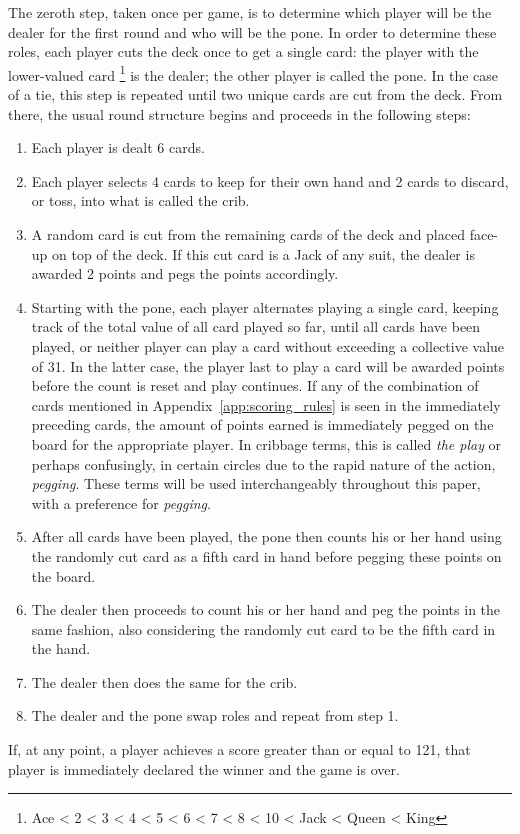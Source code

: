 The zeroth step, taken once per game, is to determine which player will be the
dealer for the first round and who will be the pone.
%
%
In order to determine these roles,
each player cuts the deck once to get a single card:
the player with the lower-valued card%
\footnote{Ace < 2 < 3 < 4 < 5 < 6 < 7 < 8 < 10 < Jack < Queen < King}
is the dealer;
the other player is called the pone.
In the case of a tie, this step is repeated until two unique cards are
cut from the deck.
%
From there, the usual round structure begins and proceeds in the following
steps:
%
\begin{enumerate}
%
\item Each player is dealt 6 cards.
%
\item Each player selects 4 cards to keep for their own hand and 2 cards to
	discard, or toss, into what is called the crib.
%
\item A random card is cut from the remaining cards of the deck and placed
	face-up on top of the deck.
	If this cut card is a Jack of any suit,
	the dealer is awarded 2 points and pegs the points accordingly.
%
\item Starting with the pone, each player alternates playing a single card,
	keeping track of the total value of all card played so far,
	until all cards have been played,
	or neither player can play a card without exceeding a collective value of
	31.
	In the latter case, the player last to play a card will be awarded points
	before the count is reset and play continues.
	If any of the combination of cards mentioned in
	Appendix~\ref{app:scoring_rules} is seen in the immediately preceding cards,
	the amount of points earned is immediately pegged on the board for the
	appropriate player.
	In cribbage terms, this is called \textit{the play}
	or perhaps confusingly,
	in certain circles due to the rapid nature of the
	action, \textit{pegging}.
	These terms will be used interchangeably throughout this paper,
	with a preference for \textit{pegging}.
%
\item After all cards have been played,
	the pone then counts his or her hand using the randomly cut card as a
	fifth card in hand before pegging these points on the board.
%
\item The dealer then proceeds to count his or her hand and peg the points
	in the same fashion, also considering the randomly cut card to be the
	fifth card in the hand.
%
\item The dealer then does the same for the crib.
%
\item The dealer and the pone swap roles and repeat from step 1.
%
\end{enumerate}
%
If, at any point, a player achieves a score greater than or equal to 121,
that player is immediately declared the winner and the game is over.


